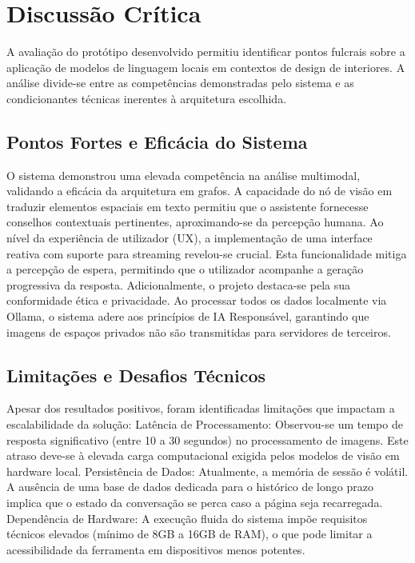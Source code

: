 \documentclass[a4paper,12pt]{scrreprt}
\begin{document}
    \section{Discussão Crítica}
        A avaliação do protótipo desenvolvido permitiu identificar pontos fulcrais sobre a aplicação de modelos de linguagem locais em contextos de design de interiores. A análise divide-se entre as competências demonstradas pelo sistema e as condicionantes técnicas inerentes à arquitetura escolhida.

        \subsection{Pontos Fortes e Eficácia do Sistema}
        O sistema demonstrou uma elevada competência na análise multimodal, validando a eficácia da arquitetura em grafos. A capacidade do nó de visão em traduzir elementos espaciais em texto permitiu que o assistente fornecesse conselhos contextuais pertinentes, aproximando-se da percepção humana.
        Ao nível da experiência de utilizador (UX), a implementação de uma interface reativa com suporte para streaming revelou-se crucial. Esta funcionalidade mitiga a percepção de espera, permitindo que o utilizador acompanhe a geração progressiva da resposta. Adicionalmente, o projeto destaca-se pela sua conformidade ética e privacidade. Ao processar todos os dados localmente via Ollama, o sistema adere aos princípios de IA Responsável, garantindo que imagens de espaços privados não são transmitidas para servidores de terceiros.

        \subsection{Limitações e Desafios Técnicos}
        Apesar dos resultados positivos, foram identificadas limitações que impactam a escalabilidade da solução:
        Latência de Processamento: Observou-se um tempo de resposta significativo (entre 10 a 30 segundos) no processamento de imagens. Este atraso deve-se à elevada carga computacional exigida pelos modelos de visão em hardware local.
        Persistência de Dados: Atualmente, a memória de sessão é volátil. A ausência de uma base de dados dedicada para o histórico de longo prazo implica que o estado da conversação se perca caso a página seja recarregada.
        Dependência de Hardware: A execução fluida do sistema impõe requisitos técnicos elevados (mínimo de 8GB a 16GB de RAM), o que pode limitar a acessibilidade da ferramenta em dispositivos menos potentes.
\end{document}
